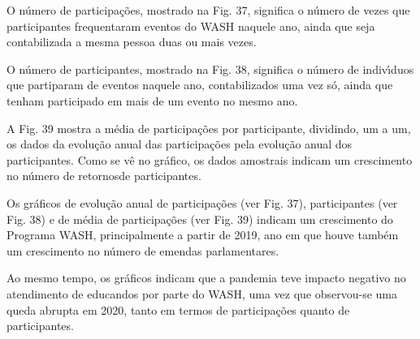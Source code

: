 \documentclass[
12pt,		%
openright,	%
twoside,  %
a4paper,			%
chapter=TITLE,		%
english,			%
french,				%
spanish,			%
brazil				%
]{USPSC-classe/USPSC}
\begin{document}
O n\'umero de participa\c{c}\~oes, mostrado na Fig. 37, significa o n\'umero de vezes que participantes frequentaram eventos do WASH naquele ano, ainda que seja contabilizada a mesma pessoa duas ou mais vezes.

















O n\'umero de participantes, mostrado na Fig. 38, significa o n\'umero de indiv\'{\i}duos que partiparam de eventos naquele ano, contabilizados uma vez s\'o, ainda que tenham participado em mais de um evento no mesmo ano.

















A Fig. 39 mostra a m\'edia de participa\c{c}\~oes por participante, dividindo, um a um, os dados da evolu\c{c}\~ao anual das participa\c{c}\~oes pela evolu\c{c}\~ao anual dos participantes. Como se v\^e no gr\'afico, os dados amostrais indicam um crescimento no n\'umero de \textquotedbl retornos\textquotedbl  de participantes.

















Os gr\'aficos de evolu\c{c}\~ao anual de participa\c{c}\~oes (ver Fig. 37), participantes (ver Fig. 38) e de m\'edia de participa\c{c}\~oes (ver Fig. 39) indicam um crescimento do Programa WASH, principalmente a partir de 2019, ano em que houve tamb\'em um crescimento no n\'umero de emendas parlamentares.

















Ao mesmo tempo, os gr\'aficos indicam que a pandemia teve impacto negativo no atendimento de educandos por parte do WASH, uma vez que observou-se uma queda abrupta em 2020, tanto em termos de participa\c{c}\~oes quanto de participantes.
\end{document}
